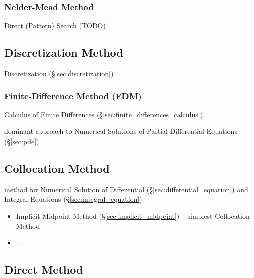 {\subsubsection{Nelder-Mead Method}\label{sec:nelder_mead}

Direct (Pattern) Search (TODO)



\subsection{Discretization Method}\label{sec:discretization_method}

Discretization (\S\ref{sec:discretization})



\subsubsection{Finite-Difference Method (FDM)}\label{sec:fdm}

Calculus of Finite Differences (\S\ref{sec:finite_differences_calculus})

dominant approach to Numerical Solutions of Partial Differential Equations
(\S\ref{sec:pde})



\subsection{Collocation Method}\label{sec:collocation_method}

method for Numerical Solution of Differential
(\S\ref{sec:differential_equation}) and Integral Equations
(\S\ref{sec:integral_equation})

\begin{itemize}
  \item Implicit Midpoint Method (\S\ref{sec:implicit_midpoint}) -- simplest
    Collocation Method
  \item ...
\end{itemize}



\subsection{Direct Method}\label{sec:direct_method}

}

